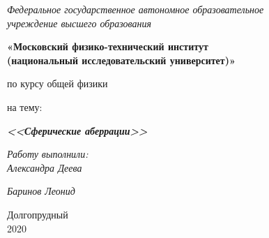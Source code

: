 \thispagestyle{empty}
\begin{center}
    \textit{Федеральное государственное автономное образовательное\\ учреждение высшего образования }

    \vspace{0.5ex}

        \textbf{«Московский физико-технический институт\\ (национальный исследовательский университет)»}
\end{center}

\vspace{10ex}

\begin{center}
    \vspace{13ex}


    \vspace{1ex}

    по курсу общей физики

    на тему:

    \textbf{\textit{<<Сферические аберрации>>}}

    \vspace{30ex}

    \begin{flushright}
        \noindent
        \textit{Работу выполнили:}\\  
        \textit{Александра Деева}%

        \textit{Баринов Леонид}%
    \end{flushright}
    \vfill
    Долгопрудный \\2020
\newpage
\setcounter{page}{1}
\fancyhead[R]{\nouppercase{\leftmark}}	
\end{center}

